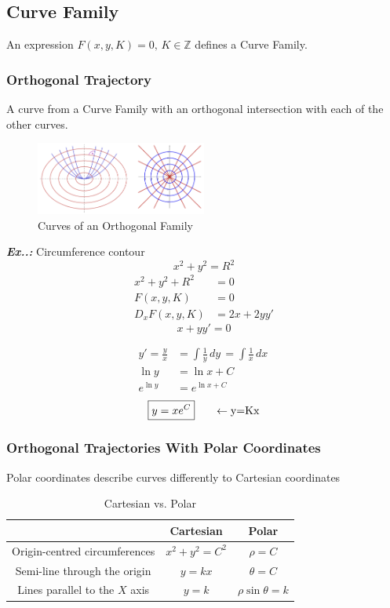 \documentclass[a4paper]{article}
\begin{document}
\subsection{Curve Family}
\setcounter{equation}{0}

An expression $F(x,y,K)=0,\,K\in\mathbb{Z}$ defines a Curve Family.

\subsubsection{Orthogonal Trajectory}
A curve from a Curve Family with an orthogonal intersection with each of the other curves.

\begin{figure}[H]
    \centering
    \includegraphics[width=0.5\textwidth]{IMG/ortho_fam.png}
    \caption{Curves of an Orthogonal Family}
    \label{fig:ortho_fam}
\end{figure}

\vspace{2ex}\textbf{\textit{Ex.\thesection.\theex: }}Circumference contour
$$
x^{2}+y^{2}=R^{2}
$$
\begin{align}
x^{2}+y^{2}+R^{2}&=0 \\
F(x,y,K)&=0 \\
D_{x}F(x,y,K)&=2x+2yy'
\end{align}
$$
\boxed{x+yy'=0}
$$
\vspace{1ex}\vspace{1ex}

\begin{align}
y'=\frac{y}{x}&=\int \frac{1}{y} \, dy\, =\int \frac{1}{x} \, dx\,  \\
\ln y&=\ln x+C \\
e^{ \ln y }&=e^{ \ln x+C }
\end{align}
$$
\boxed{y=xe^{ C }}\hspace{4ex}\leftarrow\text{y=Kx}
$$

\subsubsection{Orthogonal Trajectories With Polar Coordinates}
Polar coordinates describe curves differently to Cartesian coordinates
\begin{table}[H]
    \centering
    \begin{tabular}{c|c|c}
        & Cartesian & Polar \\ \hline
        Origin-centred circumferences & $x^2+y^2=C^2$ & $\rho=C$ \\ \hline
        Semi-line through the origin & $y=kx$ & $\theta=C$ \\ \hline
        Lines parallel to the $X$ axis & $y=k$ & $\rho\sin\theta=k$
    \end{tabular}
    \caption{Cartesian vs. Polar}
    \label{tab:polars}
\end{table}
\end{document}
